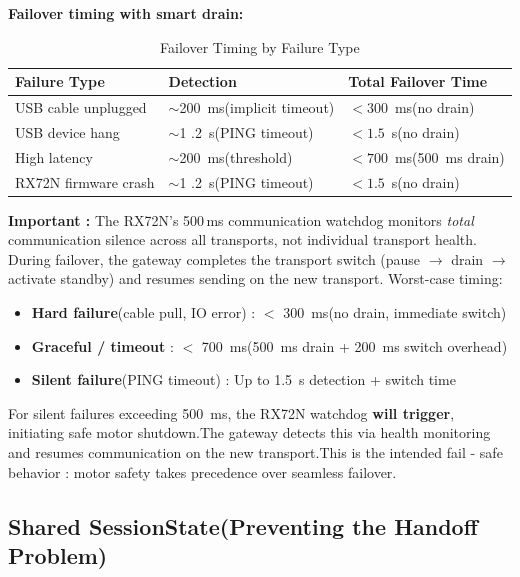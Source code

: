 \textbf{Failover timing with smart drain:}

\begin{table}[H]
\centering
\caption { Failover Timing by Failure Type}
\label {
tab:
  failover - timing
}
\begin{tabular} { l l l}
\toprule
\textbf{Failure Type} & \textbf{Detection} & \textbf{Total Failover Time
}
\\
\midrule USB cable unplugged &$\sim$200\, ms(implicit timeout) & $ < 300 $\,
    ms(no drain) \\
USB device hang &$\sim$1 .2\, s(PING timeout) & $ < 1.5 $\,
    s(no drain) \\
High latency &$\sim$200\, ms(threshold) & $ < 700 $\,
    ms(500\, ms drain) \\
RX72N firmware crash &$\sim$1 .2\,
    s(PING timeout) & $ < 1.5 $\, s(no drain) \\
\bottomrule
\end{tabular}
\end{table}

\noindent\colorbox{importantcolor} {
  \parbox{\dimexpr\linewidth - 2\fboxsep} {
\textbf{Important :} The RX72N's 500\,ms communication watchdog monitors \emph{total} communication silence across all transports, not individual transport health. During failover, the gateway completes the transport switch (pause $\rightarrow$ drain $\rightarrow$ activate standby) and resumes sending on the new transport. Worst-case timing:
\begin{itemize}[leftmargin = 1.5em, topsep = 2pt, itemsep = 1pt]
    \item \textbf{Hard failure}(cable pull, IO error)
        : $ <
        $ 300\,
    ms(no drain, immediate switch)
    \item \textbf{Graceful / timeout} : $ < $ 700\,
        ms(500\, ms drain + 200\, ms switch overhead)
    \item \textbf{Silent failure}(PING timeout)
        : Up to 1.5\, s detection + switch time
\end{itemize} For silent failures exceeding 500\, ms,
          the RX72N watchdog \textbf{will trigger},
          initiating safe motor shutdown.The gateway
                  detects this via health monitoring and
              resumes communication on the new transport.This is the intended
                      fail -
                  safe behavior
        : motor safety takes precedence over seamless failover.
 }
}

\subsection{Shared SessionState(Preventing the Handoff Problem)}
\label{subsec : shared - session}

